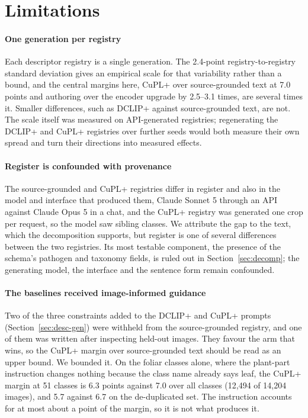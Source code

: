 \documentclass[a4paper,fleqn]{cas-dc}
\begin{document}
\section{Limitations}
\label{sec:limits}

\paragraph{One generation per registry} Each descriptor registry is a single generation. The
2.4-point registry-to-registry standard deviation gives an empirical scale for that variability
rather than a bound, and the central margins here, CuPL+ over source-grounded text at 7.0 points and
authoring over the encoder upgrade by 2.5--3.1 times, are several times it. Smaller differences, such
as DCLIP+ against source-grounded text, are not. The scale itself was measured on API-generated
registries; regenerating the DCLIP+ and CuPL+ registries over further seeds would both measure their
own spread and turn their directions into measured effects.

\paragraph{Register is confounded with provenance} The source-grounded and CuPL+ registries differ in
register and also in the model and interface that produced them, Claude Sonnet 5 through an API
against Claude Opus 5 in a chat, and the CuPL+ registry was generated one crop per request, so the
model saw sibling classes. We attribute the gap to the text, which the decomposition supports, but register is one of several
differences between the two registries. Its most testable component, the presence of the schema's
pathogen and taxonomy fields, is ruled out in Section~\ref{sec:decomp}; the generating model, the
interface and the sentence form remain confounded.

\paragraph{The baselines received image-informed guidance} Two of the three constraints added to the
DCLIP+ and CuPL+ prompts (Section~\ref{sec:desc-gen}) were withheld from the source-grounded
registry, and one of them was written after inspecting held-out images. They favour the arm that wins, so the CuPL+ margin over source-grounded text should be read as an
upper bound. We bounded it. On the foliar classes alone, where the plant-part instruction changes
nothing because the class name already says leaf, the CuPL+ margin at 51 classes is 6.3 points
against 7.0 over all classes (12,494 of 14,204 images), and 5.7 against 6.7 on the de-duplicated
set. The instruction accounts for at most about a point of the margin, so it is not what produces
it.
\end{document}
